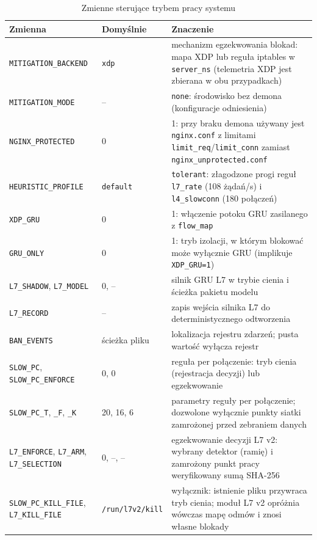 \documentclass[a4paper,12pt]{article}
\begin{document}
\begin{table}[H]
\centering
\small
\caption{Zmienne sterujące trybem pracy systemu}\label{tab:tryby}
\begin{tabularx}{\linewidth}{@{}L{3.6cm}L{2.2cm}Y@{}}
\toprule
Zmienna & Domyślnie & Znaczenie \\
\midrule
\texttt{MITIGATION\_BACKEND} & \texttt{xdp} & mechanizm egzekwowania blokad: mapa XDP lub reguła iptables w \texttt{server\_ns} (telemetria XDP jest zbierana w obu przypadkach) \\
\texttt{MITIGATION\_MODE} & -- & \texttt{none}: środowisko bez demona (konfiguracje odniesienia) \\
\texttt{NGINX\_PROTECTED} & 0 & 1: przy braku demona używany jest \texttt{nginx.conf} z limitami \texttt{limit\_req}/\texttt{limit\_conn} zamiast \texttt{nginx\_unprotected.conf} \\
\texttt{HEURISTIC\_PROFILE} & \texttt{default} & \texttt{tolerant}: złagodzone progi reguł \texttt{l7\_rate} (108 żądań/s) i \texttt{l4\_slowconn} (180 połączeń) \\
\texttt{XDP\_GRU} & 0 & 1: włączenie potoku GRU zasilanego z \texttt{flow\_map} \\
\texttt{GRU\_ONLY} & 0 & 1: tryb izolacji, w którym blokować może wyłącznie GRU (implikuje \texttt{XDP\_GRU=1}) \\
\texttt{L7\_SHADOW}, \texttt{L7\_MODEL} & 0, -- & silnik GRU L7 w trybie cienia i ścieżka pakietu modelu \\
\texttt{L7\_RECORD} & -- & zapis wejścia silnika L7 do deterministycznego odtworzenia \\
\texttt{BAN\_EVENTS} & ścieżka pliku & lokalizacja rejestru zdarzeń; pusta wartość wyłącza rejestr \\
\texttt{SLOW\_PC}, \texttt{SLOW\_PC\_ENFORCE} & 0, 0 & reguła per połączenie: tryb cienia (rejestracja decyzji) lub egzekwowanie \\
\texttt{SLOW\_PC\_T}, \texttt{\_F}, \texttt{\_K} & 20, 16, 6 & parametry reguły per połączenie; dozwolone wyłącznie punkty siatki zamrożonej przed zebraniem danych \\
\texttt{L7\_ENFORCE}, \texttt{L7\_ARM}, \texttt{L7\_SELECTION} & 0, --, -- & egzekwowanie decyzji L7 v2: wybrany detektor (ramię) i zamrożony punkt pracy weryfikowany sumą SHA-256 \\
\texttt{SLOW\_PC\_KILL\_FILE}, \texttt{L7\_KILL\_FILE} & \texttt{/run/\allowbreak l7v2/\allowbreak kill} & wyłącznik: istnienie pliku przywraca tryb cienia; moduł L7 v2 opróżnia wówczas mapę odmów i znosi własne blokady \\
\bottomrule
\end{tabularx}
\end{table}
\end{document}
